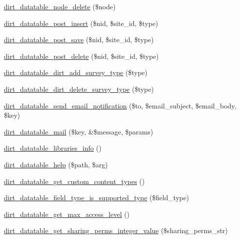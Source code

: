 \begin{DoxyCompactItemize}
\item 
\mbox{\hyperlink{dirt__datatable_8module_aa9b9348e81b8b2f34a97a1124de44c7e}{dirt\+\_\+datatable\+\_\+node\+\_\+delete}} (\$node)
\item 
\mbox{\hyperlink{dirt__datatable_8module_aca5a78ccce6ce90ea8119b0ad4307bc2}{dirt\+\_\+datatable\+\_\+post\+\_\+insert}} (\$nid, \$site\+\_\+id, \$type)
\item 
\mbox{\hyperlink{dirt__datatable_8module_a5d2be29b361b6ff0cf9dc53badf91ea5}{dirt\+\_\+datatable\+\_\+post\+\_\+save}} (\$nid, \$site\+\_\+id, \$type)
\item 
\mbox{\hyperlink{dirt__datatable_8module_a92d09e60d2f855376e26f88e9cab3140}{dirt\+\_\+datatable\+\_\+post\+\_\+delete}} (\$nid, \$site\+\_\+id, \$type)
\item 
\mbox{\hyperlink{dirt__datatable_8module_a0a6b39201839d85225f73026ff5368df}{dirt\+\_\+datatable\+\_\+dirt\+\_\+add\+\_\+survey\+\_\+type}} (\$type)
\item 
\mbox{\hyperlink{dirt__datatable_8module_aa0c992ebb0977b4dcb7fe8b44bd2843f}{dirt\+\_\+datatable\+\_\+dirt\+\_\+delete\+\_\+survey\+\_\+type}} (\$type)
\item 
\mbox{\hyperlink{dirt__datatable_8module_a59006b4ebfd17d2aab9deb0188821e38}{dirt\+\_\+datatable\+\_\+send\+\_\+email\+\_\+notification}} (\$to, \$email\+\_\+subject, \$email\+\_\+body, \$key)
\item 
\mbox{\hyperlink{dirt__datatable_8module_a659c7133b23e4f1e8ff7af72b87fb993}{dirt\+\_\+datatable\+\_\+mail}} (\$key, \&\$message, \$params)
\item 
\mbox{\hyperlink{dirt__datatable_8module_a81361a75fe813ccab49a080e87b75c29}{dirt\+\_\+datatable\+\_\+libraries\+\_\+info}} ()
\item 
\mbox{\hyperlink{dirt__datatable_8module_a9a6048325dc33f1e26d02e190ea7de12}{dirt\+\_\+datatable\+\_\+help}} (\$path, \$arg)
\item 
\mbox{\hyperlink{dirt__datatable_8module_a234077e641d7ec470dd6bb0978228e3d}{dirt\+\_\+datatable\+\_\+get\+\_\+custom\+\_\+content\+\_\+types}} ()
\item 
\mbox{\hyperlink{dirt__datatable_8module_a673d126527d204b1707927a36b870a14}{dirt\+\_\+datatable\+\_\+field\+\_\+type\+\_\+is\+\_\+supported\+\_\+type}} (\$field\+\_\+type)
\item 
\mbox{\hyperlink{dirt__datatable_8module_a71162f38451c9cc9fe97f09fe6190b60}{dirt\+\_\+datatable\+\_\+get\+\_\+max\+\_\+access\+\_\+level}} ()
\item 
\mbox{\hyperlink{dirt__datatable_8module_a78cbe7fb6141364c2178c147c1472a40}{dirt\+\_\+datatable\+\_\+get\+\_\+sharing\+\_\+perms\+\_\+integer\+\_\+value}} (\$sharing\+\_\+perms\+\_\+str)

\end{DoxyCompactItemize}
